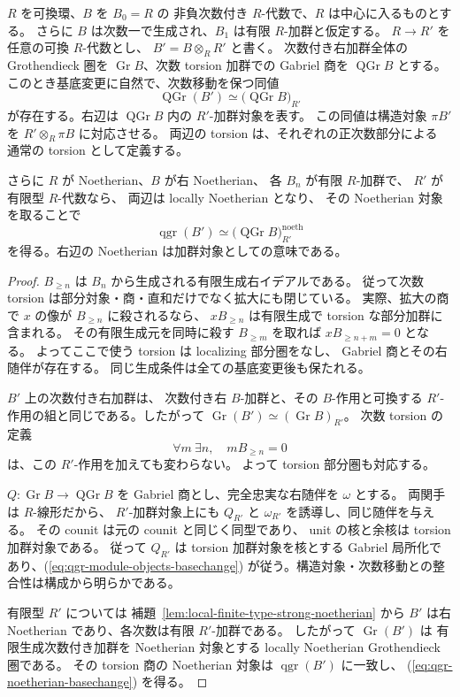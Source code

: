 \begin{lemma}
\label{lem:qgr-module-object-basechange}
$R$ を可換環、$B$ を $B_0=R$ の
非負次数付き $R$-代数で、$R$ は中心に入るものとする。
さらに $B$ は次数一で生成され、$B_1$ は有限 $R$-加群と仮定する。
$R\to R'$ を任意の可換 $R$-代数とし、
$B'=B\otimes_RR'$ と書く。
次数付き右加群全体の Grothendieck 圏を
$\operatorname{Gr}B$、次数 torsion 加群での
Gabriel 商を $\operatorname{QGr}B$ とする。
このとき基底変更に自然で、次数移動を保つ同値
\[
 \operatorname{QGr}(B')
   \simeq \bigl(\operatorname{QGr}B\bigr)_{R'}
 \tag{QGr-BC}\label{eq:qgr-module-objects-basechange}
\]
が存在する。右辺は $\operatorname{QGr}B$ 内の
$R'$-加群対象を表す。
この同値は構造対象 $\pi B'$ を
$R'\otimes_R\pi B$ に対応させる。
両辺の torsion は、それぞれの正次数部分による
通常の torsion として定義する。

さらに $R$ が Noetherian、$B$ が右 Noetherian、
各 $B_n$ が有限 $R$-加群で、
$R'$ が有限型 $R$-代数なら、
両辺は locally Noetherian となり、
その Noetherian 対象を取ることで
\[
 \operatorname{qgr}(B')
   \simeq
    \bigl(\operatorname{QGr}B\bigr)_{R'}^{\mathrm{noeth}}
 \tag{qgr-BC}\label{eq:qgr-noetherian-basechange}
\]
を得る。右辺の Noetherian は加群対象としての意味である。
\end{lemma}
\begin{proof}
$B_{\ge n}$ は $B_n$ から生成される有限生成右イデアルである。
従って次数 torsion は部分対象・商・直和だけでなく拡大にも閉じている。
実際、拡大の商で $x$ の像が $B_{\ge n}$ に殺されるなら、
$xB_{\ge n}$ は有限生成で torsion な部分加群に含まれる。
その有限生成元を同時に殺す $B_{\ge m}$ を取れば
$xB_{\ge n+m}=0$ となる。
よってここで使う torsion は localizing 部分圏をなし、
Gabriel 商とその右随伴が存在する。
同じ生成条件は全ての基底変更後も保たれる。

$B'$ 上の次数付き右加群は、
次数付き右 $B$-加群と、その $B$-作用と可換する
$R'$-作用の組と同じである。したがって
$\operatorname{Gr}(B')\simeq(\operatorname{Gr}B)_{R'}$。
次数 torsion の定義
\[
 \forall m\ \exists n,\quad m B_{\ge n}=0
\]
は、この $R'$-作用を加えても変わらない。
よって torsion 部分圏も対応する。

$Q:\operatorname{Gr}B\to\operatorname{QGr}B$ を
Gabriel 商とし、完全忠実な右随伴を $\omega$ とする。
両関手は $R$-線形だから、
$R'$-加群対象上にも $Q_{R'}$ と
$\omega_{R'}$ を誘導し、同じ随伴を与える。
その counit は元の counit と同じく同型であり、
unit の核と余核は torsion 加群対象である。
従って $Q_{R'}$ は torsion 加群対象を核とする
Gabriel 局所化であり、(\ref{eq:qgr-module-objects-basechange})
が従う。構造対象・次数移動との整合性は構成から明らかである。

有限型 $R'$ については
補題~\ref{lem:local-finite-type-strong-noetherian}
から $B'$ は右 Noetherian であり、各次数は有限 $R'$-加群である。
したがって $\operatorname{Gr}(B')$ は
有限生成次数付き加群を Noetherian 対象とする locally
Noetherian Grothendieck 圏である。
その torsion 商の Noetherian 対象は
$\operatorname{qgr}(B')$ に一致し、
(\ref{eq:qgr-noetherian-basechange}) を得る。
\end{proof}


